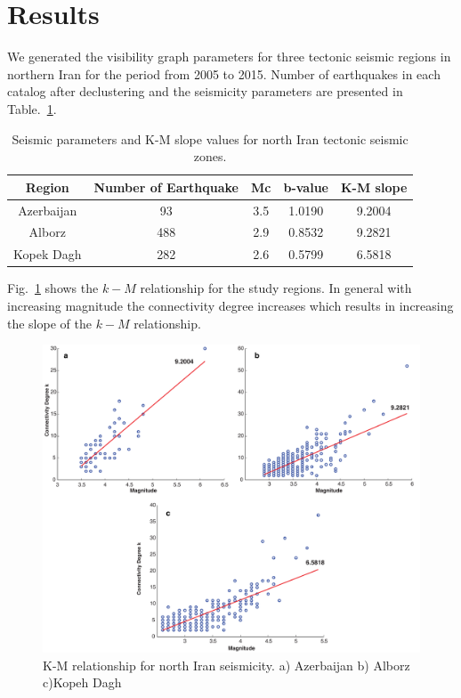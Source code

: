 
\section{Results}
\noindent
We generated the visibility graph parameters for three tectonic seismic regions in northern Iran for the period from 2005 to 2015. Number of earthquakes in each catalog after declustering and the seismicity parameters are presented in Table.~\ref{tab:b_k_m_param}. 


\begin{table}[h]
\centering
\caption{Seismic parameters and K-M slope values for north Iran tectonic seismic zones.}
\begin{tabular}{ccccc}
Region          & Number of Earthquake &  Mc &  b-value & K-M slope \\ \hline
Azerbaijan     & 93                                 & 3.5   & 1.0190  & 9.2004       \\ \hline
Alborz            & 488                               & 2.9   & 0.8532  & 9.2821      \\ \hline
Kopek Dagh  & 282                               & 2.6   & 0.5799  & 6.5818     \\ \hline
\end{tabular}
\label{tab:b_k_m_param}
\end{table}

\noindent
Fig.~\ref{fig:k_m_plot_m} shows the $k-M$ relationship for the study regions.  In general with increasing magnitude the connectivity degree increases which results in increasing the slope of the $k-M$ relationship. 

\begin{figure} [ht]
\centering
\includegraphics[scale=0.35]{figures/pdf/Figure05.pdf} 
\caption{ K-M relationship for north Iran seismicity. a) Azerbaijan b) Alborz c)Kopeh Dagh}
\label{fig:k_m_plot_m}
\end{figure}

